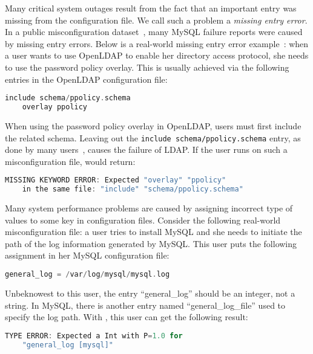Many critical system outages result from the fact that an important
entry was missing from the configuration file. 
We call such a problem a {\em missing entry error}.
In a public misconfiguration dataset~\cite{configdataset},
many MySQL failure reports were caused by
missing entry errors.
Below is a real-world missing entry error example~\cite{yin11anempirical}:
when a user wants to use OpenLDAP to enable her directory access
protocol, she needs to use the password policy overlay. This is usually
achieved via the following entries in the OpenLDAP configuration file:

\begin{lstlisting}[language=C, xleftmargin=.01\textwidth]
    include schema/ppolicy.schema
    overlay ppolicy
\end{lstlisting} 

When using the password policy overlay in OpenLDAP, 
users must first include the related schema.
Leaving out the {\tt include schema/ppolicy.schema} entry, 
as done by many users~\cite{yin11anempirical}, 
causes the failure of LDAP. 
If the user runs \app on such a misconfiguration file,
\app would return:

\begin{lstlisting}[language=C, xleftmargin=.01\textwidth]
    MISSING KEYWORD ERROR: Expected "overlay" "ppolicy"
    in the same file: "include" "schema/ppolicy.schema"
\end{lstlisting} 

Many system performance problems are caused by 
assigning incorrect type of values to some key in configuration
files. Consider the following real-world misconfiguration file: 
a user tries to install MySQL and she needs to initiate the path
of the log information generated by MySQL.
This user puts the following assignment in her MySQL
configuration file: 

\begin{lstlisting}[language=C, xleftmargin=.01\textwidth]
    general_log = /var/log/mysql/mysql.log
\end{lstlisting} 

Unbeknowest to this user, the entry ``general\_log'' should be an 
integer, not a string. In MySQL, there is another entry named
``general\_log\_file'' used to specify the log path.
With \app, this user can get the following result:

\begin{lstlisting}[language=C, xleftmargin=.01\textwidth]
    TYPE ERROR: Expected a Int with P=1.0 for
    "general_log [mysql]"
\end{lstlisting} 

